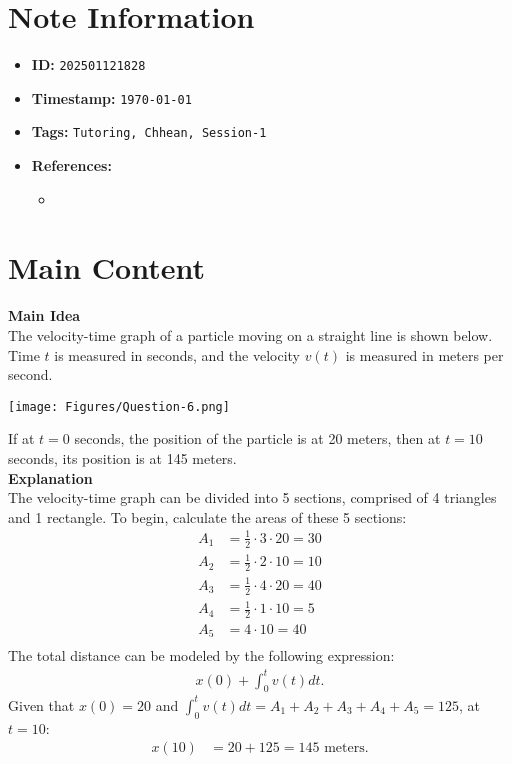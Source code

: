 \clearpage
{}
\label{202501121828}
\renewcommand{\notetitle}{Question 6}

\section*{Note Information}
\begin{itemize}
  \item \textbf{ID:} \texttt{202501121828}
  \item \textbf{Timestamp:} \texttt{\today \ \currenttime}
  \item \textbf{Tags:} \texttt{Tutoring, Chhean, Session-1}
  \item \textbf{References:}
    \begin{itemize}
      \item \href{}{}
    \end{itemize}
\end{itemize}


\section*{Main Content}
\textbf{Main Idea}\\
 The velocity-time graph of a particle moving on a straight line is shown below. Time $t$ is measured in seconds, and the velocity $v(t)$ is measured in meters per second.
 \begin{center}
  \texttt{[image: Figures/Question-6.png]}
 \end{center}
 If at $t = 0$ seconds, the position of the particle is at 20 meters, then at $t = 10$ seconds, its position is at 145 meters.\\

\textbf{Explanation}\\
The velocity-time graph can be divided into 5 sections, comprised of 4 triangles and 1 rectangle. To begin, calculate the areas of these 5 sections:
\begin{align*}
  A_1 &= \frac{1}{2} \cdot 3 \cdot 20 = 30\\
  A_2 &= \frac{1}{2} \cdot 2 \cdot 10 = 10\\
  A_3 &= \frac{1}{2} \cdot 4 \cdot 20 = 40\\
  A_4 &= \frac{1}{2} \cdot 1 \cdot 10 = 5\\
  A_5 &= 4 \cdot 10 = 40\\
\end{align*}
The total distance can be modeled by the following expression:
\begin{align*}
  x(0) + \int_0^t v(t) dt.
\end{align*}
Given that $x(0) = 20$ and $\int_0^t v(t) dt = A_1 + A_2 + A_3 + A_4 + A_5 = 125$, at $t = 10$:
\begin{align*}
  x(10) &= 20 + 125 = 145 \text{ meters}.\\
\end{align*}


